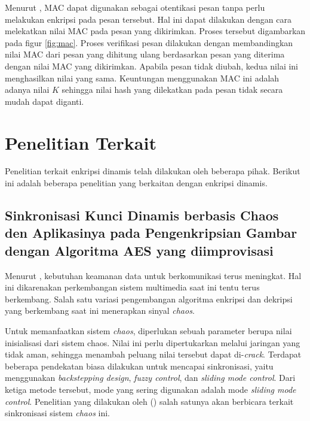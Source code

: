 Menurut \textcite{munir2019}, MAC dapat digunakan sebagai otentikasi pesan tanpa perlu melakukan enkripsi pada pesan tersebut. Hal ini dapat dilakukan dengan cara melekatkan nilai MAC pada pesan yang dikirimkan. Proses tersebut digambarkan pada figur \ref{fig:mac}. Proses verifikasi pesan dilakukan dengan membandingkan nilai MAC dari pesan yang dihitung ulang berdasarkan pesan yang diterima dengan nilai MAC yang dikirimkan. Apabila pesan tidak diubah, kedua nilai ini menghasilkan nilai yang sama. Keuntungan menggunakan MAC ini adalah adanya nilai $K$ sehingga nilai hash yang dilekatkan pada pesan tidak secara mudah dapat diganti.

\section{Penelitian Terkait}

Penelitian terkait enkripsi dinamis telah dilakukan oleh beberapa pihak. Berikut ini adalah beberapa penelitian yang berkaitan dengan enkripsi dinamis. 

\subsection{Sinkronisasi Kunci Dinamis berbasis Chaos den Aplikasinya pada Pengenkripsian Gambar dengan Algoritma AES yang diimprovisasi}

Menurut \textcite{lin2021}, kebutuhan keamanan data untuk berkomunikasi terus meningkat. Hal ini dikarenakan perkembangan sistem multimedia saat ini tentu terus berkembang. Salah satu variasi pengembangan algoritma enkripsi dan dekripsi yang berkembang saat ini menerapkan sinyal \emph{chaos}. 

Untuk memanfaatkan sistem \emph{chaos}, diperlukan sebuah parameter berupa nilai inisialisasi dari sistem chaos. Nilai ini perlu dipertukarkan melalui jaringan yang tidak aman, sehingga menambah peluang nilai tersebut dapat di-\emph{crack}. Terdapat beberapa pendekatan biasa dilakukan untuk mencapai sinkronisasi, yaitu menggunakan \emph{backstepping design}, \emph{fuzzy control}, dan \emph{sliding mode control}. Dari ketiga metode tersebut, mode yang sering digunakan adalah mode \emph{sliding mode control}. Penelitian yang dilakukan oleh (\cite{lin2021}) salah satunya akan berbicara terkait sinkronisasi sistem \emph{chaos} ini.

